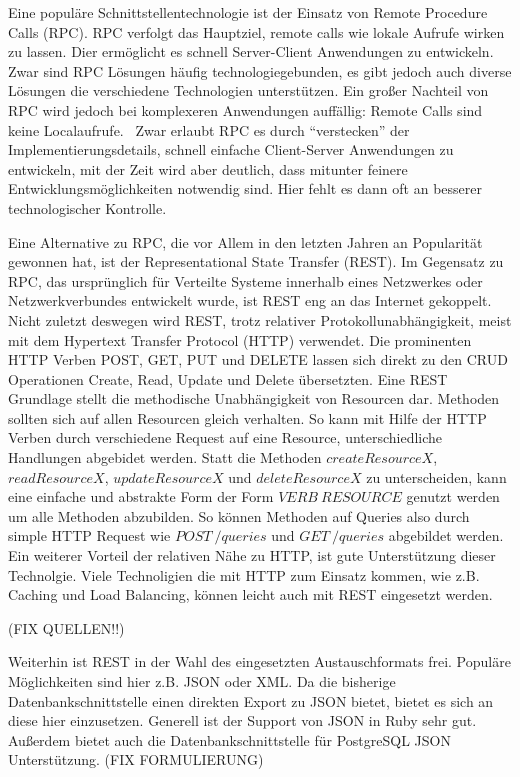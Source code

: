 Eine populäre Schnittstellentechnologie ist der Einsatz von Remote Procedure Calls (RPC). RPC verfolgt das Hauptziel, remote calls wie lokale Aufrufe wirken zu lassen. Dier ermöglicht es schnell Server-Client Anwendungen zu entwickeln. Zwar sind RPC Lösungen häufig technologiegebunden, es gibt jedoch auch diverse Lösungen die verschiedene Technologien unterstützen. Ein großer Nachteil von RPC wird jedoch bei komplexeren Anwendungen auffällig: Remote Calls sind keine Localaufrufe.~\cite[][Seite 47]{newman2015building} Zwar erlaubt RPC es durch ``verstecken'' der Implementierungsdetails, schnell einfache Client-Server Anwendungen zu entwickeln, mit der Zeit wird aber deutlich, dass mitunter feinere Entwicklungsmöglichkeiten notwendig sind. Hier fehlt es dann oft an besserer technologischer Kontrolle.

Eine Alternative zu RPC, die vor Allem in den letzten Jahren an Popularität gewonnen hat, ist der Representational State Transfer (REST). Im Gegensatz zu RPC, das ursprünglich für Verteilte Systeme innerhalb eines Netzwerkes oder Netzwerkverbundes entwickelt wurde, ist REST eng an das Internet gekoppelt. Nicht zuletzt deswegen wird REST, trotz relativer Protokollunabhängigkeit, meist mit dem Hypertext Transfer Protocol (HTTP) verwendet. Die prominenten HTTP Verben POST, GET, PUT und DELETE lassen sich direkt zu den CRUD Operationen Create, Read, Update und Delete übersetzten. Eine REST Grundlage stellt die methodische Unabhängigkeit von Resourcen dar. Methoden sollten sich auf allen Resourcen gleich verhalten. So kann mit Hilfe der HTTP Verben durch verschiedene Request auf eine Resource, unterschiedliche Handlungen abgebidet werden. Statt die Methoden $createResourceX$, $readResourceX$, $updateResourceX$ und $deleteResourceX$ zu unterscheiden, kann eine einfache und abstrakte Form der Form $VERB\ RESOURCE$ genutzt werden um alle Methoden abzubilden. So können Methoden auf Queries also durch simple HTTP Request wie $POST\ /queries$ und $GET\ /queries$ abgebildet werden. Ein weiterer Vorteil der relativen Nähe zu HTTP, ist gute Unterstützung dieser Technolgie. Viele Technoligien die mit HTTP zum Einsatz kommen, wie z.B. Caching und Load Balancing, können leicht auch mit REST eingesetzt werden.

(FIX QUELLEN!!)

Weiterhin ist REST in der Wahl des eingesetzten Austauschformats frei. Populäre Möglichkeiten sind hier z.B. JSON oder XML. Da die bisherige Datenbankschnittstelle einen direkten Export zu JSON bietet, bietet es sich an diese hier einzusetzen. Generell ist der Support von JSON in Ruby sehr gut. Außerdem bietet auch die Datenbankschnittstelle für PostgreSQL JSON Unterstützung. (FIX FORMULIERUNG)

